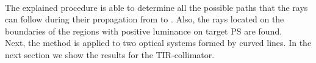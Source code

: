 \begin{algorithm}
\begin{algorithmic}[1]
\If {$\lineaj\neq \nline$}
\State{}
\EndIf 
\State{}
\EndIf
\EndProcedure
\end{algorithmic}
\end{algorithm}
\\ \indent The explained procedure is able to determine all the possible paths that the rays can follow during their propagation from  to . Also, the rays located on the boundaries of the regions with positive luminance on target PS  are found.\\ \indent
Next, the method is applied to two optical systems formed by curved lines. In the next section we show the results for the TIR-collimator.
